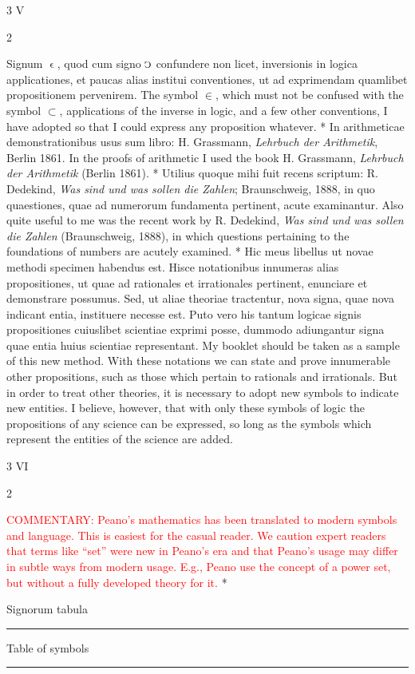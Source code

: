 \documentclass{book}
\newcommand{\s}{\switchcolumn} %
\newcommand{\C}{\mathop{\sbox0{$\displaystyle$$\reflectbox{C}$} %
\raisebox{-\height+\ht0-0.05cm}[\ht0][\dp0]{\scalebox{0.8}[0.8]{\copy0}}}\displaylimits} %
\newcommand{\smallIn}{\ensuremath{\mathrel{\epsilon}}}
\newcommand\commentary[1]{\textcolor{red}{COMMENTARY: #1}}
\newcommand\peanoHeadingMedium[1]{ \vspace{1cm} {\Large #1} \nopagebreak[4]

  \noindent\rule{1cm}{0.4pt} \nopagebreak[1]}
\newcommand{\peanoPage}[1]{\vspace{1ex}

  \columnratio{0.475, 0.05, 0.475} \begin{paracol}{3} \centering \hdashrule{\columnwidth}{0.1mm}{0.1mm 1mm} \s #1 \s \hdashrule{\columnwidth}{0.1mm}{0.1mm 1mm} \end{paracol}

\vspace{1ex}}
\newenvironment{translateTwoCol}
               { %
                 \columnratio{0.5, 0.5} \begin{paracol}{2}
                 \newcommand{\LAT}{\switchcolumn[0]*}
                 \newcommand{\ENG}{\switchcolumn[1]}
               }
               { %
                 \let\ENG\undefined
                 \let\LAT\undefined
                 \end{paracol}
               }
\begin{document}
\peanoPage{V} %

\begin{translateTwoCol}
Signum $\smallIn$, quod cum signo $\C$ confundere non licet, inversionis in logica applicationes, et paucas alias institui conventiones, ut ad exprimendam quamlibet propositionem pervenirem.
\ENG
The symbol $\in$, which must not be confused with the symbol $\subset$, applications of the inverse in logic, and a few other conventions, I have adopted so that I could express any proposition whatever.
\LAT
In arithmeticae demonstrationibus usus sum libro: H. Grassmann, \emph{Lehrbuch der Arithmetik}, Berlin 1861.
\ENG
In the proofs of arithmetic I used the book H. Grassmann, \emph{Lehrbuch der Arithmetik} (Berlin 1861).
\LAT
Utilius quoque mihi fuit recens scriptum: R. Dedekind, \emph{Was sind und was sollen die Zahlen}; Braunschweig, 1888, in quo quaestiones, quae ad numerorum fundamenta pertinent, acute examinantur.
\ENG
Also quite useful to me was the recent work by R. Dedekind, \emph{Was sind und was sollen die Zahlen} (Braunschweig, 1888), in which questions pertaining to the foundations of numbers are acutely examined.
\LAT
Hic meus libellus ut novae methodi specimen habendus est. Hisce notationibus innumeras alias propositiones, ut quae ad rationales et irrationales pertinent, enunciare et demonstrare possumus. Sed, ut aliae theoriae tractentur, nova signa, quae nova indicant entia, instituere necesse est. Puto vero his tantum logicae signis propositiones cuiuslibet scientiae exprimi posse, dummodo adiungantur signa quae entia huius scientiae representant.
\ENG
My booklet should be taken as a sample of this new method. With these notations we can state and prove innumerable other propositions, such as those which pertain to rationals and irrationals. But in order to treat other theories, it is necessary to adopt new symbols to indicate new entities. I believe, however, that with only these symbols of logic the propositions of any science can be expressed, so long as the symbols which represent the entities of the science are added.
\end{translateTwoCol}

\peanoPage{VI} %

\begin{translateTwoCol}
\ENG
\commentary{Peano's mathematics has been translated to modern symbols and language.  This is easiest for the casual reader.  We caution expert readers that terms like ``set'' were new in Peano's era and that Peano's usage may differ in subtle ways from modern usage.  E.g., Peano use the concept of a power set, but without a fully developed theory for it.}  
\LAT  
\centering
{}
{}
\peanoHeadingMedium{Signorum tabula}
\ENG
\peanoHeadingMedium{Table of symbols}
\end{translateTwoCol}
\end{document}
